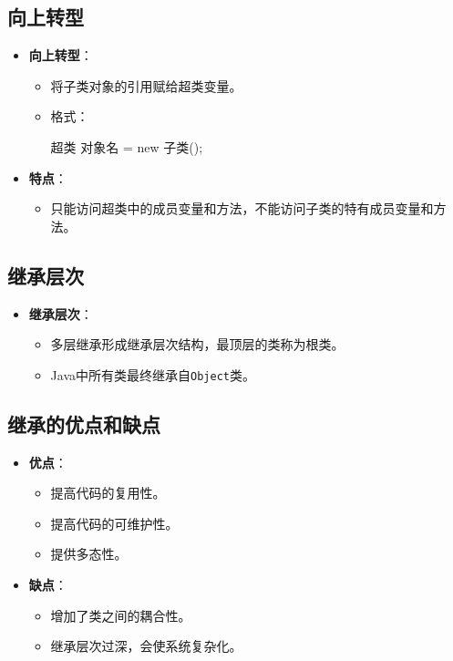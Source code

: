 \documentclass[a4paper, 10pt]{ctexart}
\begin{document}
\subsection{向上转型}
\begin{itemize}
  \item \textbf{向上转型}：
  \begin{itemize}
    \item 将子类对象的引用赋给超类变量。
    \item 格式：
    \begin{codeblock}
超类 对象名 = new 子类();
    \end{codeblock}
  \end{itemize}
  \item \textbf{特点}：
  \begin{itemize}
    \item 只能访问超类中的成员变量和方法，不能访问子类的特有成员变量和方法。
  \end{itemize}
\end{itemize}

\subsection{继承层次}
\begin{itemize}
  \item \textbf{继承层次}：
  \begin{itemize}
    \item 多层继承形成继承层次结构，最顶层的类称为根类。
    \item Java中所有类最终继承自\texttt{Object}类。
  \end{itemize}
\end{itemize}

\subsection{继承的优点和缺点}
\begin{itemize}
  \item \textbf{优点}：
  \begin{itemize}
    \item 提高代码的复用性。
    \item 提高代码的可维护性。
    \item 提供多态性。
  \end{itemize}
  \item \textbf{缺点}：
  \begin{itemize}
    \item 增加了类之间的耦合性。
    \item 继承层次过深，会使系统复杂化。
  \end{itemize}
\end{itemize}
\end{document}
